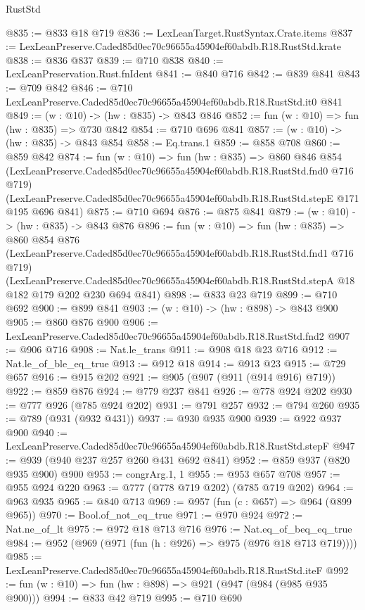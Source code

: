 \begin{lexlean}{RustStd}
\begin{coremodule}
@835 := @833 @18 @719
@836 := LexLeanTarget.RustSyntax.Crate.items
@837 := LexLeanPreserve.Caded85d0ec70c96655a45904ef60abdb.R18.RustStd.krate
@838 := @836 @837
@839 := @710 @838
@840 := LexLeanPreservation.Rust.fnIdent
@841 := @840 @716
@842 := @839 @841
@843 := @709 @842
@846 := @710 LexLeanPreserve.Caded85d0ec70c96655a45904ef60abdb.R18.RustStd.it0 @841
@849 := (w : @10) -> (hw : @835) -> @843 @846
@852 := fun (w : @10) => fun (hw : @835) => @730 @842
@854 := @710 @696 @841
@857 := (w : @10) -> (hw : @835) -> @843 @854
@858 := Eq.trans.{1}
@859 := @858 @708
@860 := @859 @842
@874 := fun (w : @10) =>
  fun (hw : @835) =>
  @860
    @846
    @854
    (LexLeanPreserve.Caded85d0ec70c96655a45904ef60abdb.R18.RustStd.fnd0 @716 @719)
    (LexLeanPreserve.Caded85d0ec70c96655a45904ef60abdb.R18.RustStd.stepE @171 @195 @696 @841)
@875 := @710 @694
@876 := @875 @841
@879 := (w : @10) -> (hw : @835) -> @843 @876
@896 := fun (w : @10) =>
  fun (hw : @835) =>
  @860
    @854
    @876
    (LexLeanPreserve.Caded85d0ec70c96655a45904ef60abdb.R18.RustStd.fnd1 @716 @719)
    (LexLeanPreserve.Caded85d0ec70c96655a45904ef60abdb.R18.RustStd.stepA
      @18
      @182
      @179
      @202
      @230
      @694
      @841)
@898 := @833 @23 @719
@899 := @710 @692
@900 := @899 @841
@903 := (w : @10) -> (hw : @898) -> @843 @900
@905 := @860 @876 @900
@906 := LexLeanPreserve.Caded85d0ec70c96655a45904ef60abdb.R18.RustStd.fnd2
@907 := @906 @716
@908 := Nat.le_trans
@911 := @908 @18 @23 @716
@912 := Nat.le_of_ble_eq_true
@913 := @912 @18
@914 := @913 @23
@915 := @729 @657
@916 := @915 @202
@921 := @905 (@907 (@911 (@914 @916) @719))
@922 := @859 @876
@924 := @779 @237 @841
@926 := @778 @924 @202
@930 := @777 @926 (@785 @924 @202)
@931 := @791 @257
@932 := @794 @260
@935 := @789 (@931 (@932 @431))
@937 := @930 @935 @900
@939 := @922 @937 @900
@940 := LexLeanPreserve.Caded85d0ec70c96655a45904ef60abdb.R18.RustStd.stepF
@947 := @939 (@940 @237 @257 @260 @431 @692 @841)
@952 := @859 @937 (@820 @935 @900) @900
@953 := congrArg.{1, 1}
@955 := @953 @657 @708
@957 := @955 @924 @220
@963 := @777 (@778 @719 @202) (@785 @719 @202)
@964 := @963 @935
@965 := @840 @713
@969 := @957 (fun (c : @657) => @964 (@899 @965))
@970 := Bool.of_not_eq_true
@971 := @970 @924
@972 := Nat.ne_of_lt
@975 := @972 @18 @713 @716
@976 := Nat.eq_of_beq_eq_true
@984 := @952 (@969 (@971 (fun (h : @926) => @975 (@976 @18 @713 @719))))
@985 := LexLeanPreserve.Caded85d0ec70c96655a45904ef60abdb.R18.RustStd.iteF
@992 := fun (w : @10) => fun (hw : @898) => @921 (@947 (@984 (@985 @935 @900)))
@994 := @833 @42 @719
@995 := @710 @690

\end{coremodule}
\end{lexlean}
